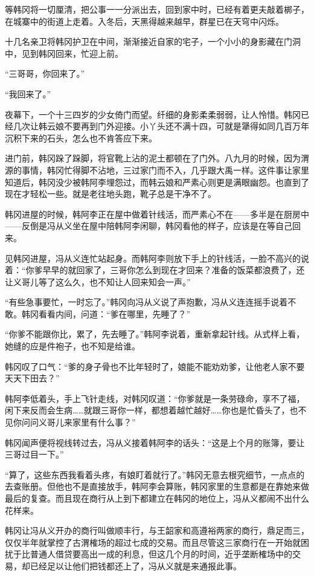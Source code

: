 等韩冈将一切厘清，把公事一一分派出去，回到家中时，已经有着更夫敲着梆子，在城寨中的街道上走着。入冬后，天黑得越来越早，群星已在天穹中闪烁。

十几名亲卫将韩冈护卫在中间，渐渐接近自家的宅子，一个小小的身影藏在门洞中，见到韩冈回来，忙迎上前。

“三哥哥，你回来了。”

“我回来了。”

夜幕下，一个十三四岁的少女倚门而望。纤细的身影柔柔弱弱，让人怜惜。韩冈已经几次让韩云娘不要再到门外迎接。小丫头还不满十四，可就是犟得如同几百万年沉积下来的石头，怎么也不肯答应下来。

进门前，韩冈跺了跺脚，将官靴上沾的泥土都顿在了门外。八九月的时候，因为渭源的事情，韩冈忙得脚不沾地，三过家门而不入，几乎跟大禹一样。这件事让家里知道后，韩冈没少被韩阿李埋怨过，而韩云娘和严素心则更是满眼幽怨。也直到了现在才轻松一些。就是老往地头跑，靴子总是干净不了。

韩冈进屋的时候，韩阿李正在屋中做着针线活，而严素心不在——多半是在厨房中——反倒是冯从义坐在屋中陪韩阿李闲聊，韩冈看他的样子，应该是在等自己回来。

见韩冈进屋，冯从义连忙站起身。而韩阿李则放下手上的针线活，一脸不高兴的说着：“你爹早早的就回家了，三哥你怎么到现在才回来？准备的饭菜都浪费了，还让义哥儿等了这么久，也不知让人回来知会一声。”

“有些急事要忙，一时忘了。”韩冈向冯从义说了声抱歉，冯从义连连摇手说着不敢。韩冈看看内间，问道：“爹在哪里，先睡了？”

“你爹不能跟你比，累了，先去睡了。”韩阿李说着，重新拿起针线。从式样上看，她缝的应是件袍子，也不知是给谁。

韩冈叹了口气：“爹的身子骨也不比年轻时了，娘能不能劝劝爹，让他老人家不要天天下田去？”

韩阿李低着头，手上飞针走线，对韩冈叹道：“你爹就是一条劳碌命，享不了福，闲下来反而会生病……就跟三哥你一样，都想着越忙越好……你也是忙昏头了，也不见你问问义哥儿来家里有什么事？”

韩冈闻声便将视线转过去，冯从义接着韩阿李的话头：“这是上个月的账簿，要让三哥过目一下。”

“算了，这些东西我看着头疼，有娘盯着就行了。”韩冈无意去根究细节，一点点的去查账册。但他也不是直接放手，韩阿李会算账，韩冈家里的生意都是在靠她来做最后的复查。而且现在商行从上到下都建立在韩冈的地位上，冯从义都闹不出什么花样来。

韩冈让冯从义开办的商行叫做顺丰行，与王韶家和高遵裕两家的商行，鼎足而三，仅仅半年就掌控了古渭榷场的超过七成的交易。而且尽管这三家商行在一开始就困扰于比普通人借贷要高出一成的利息，但这几个月的时间，近乎垄断榷场中的交易，却已经足以让他们把钱都还上了，冯从义就是来通报此事。

